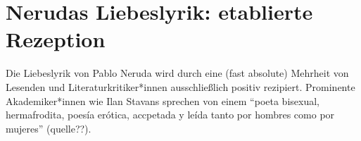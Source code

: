 \section{Nerudas Liebeslyrik: etablierte Rezeption}

Die Liebeslyrik von Pablo Neruda wird durch eine (fast absolute) Mehrheit von Lesenden und Literaturkritiker*innen ausschließlich positiv rezipiert.
Prominente Akademiker*innen wie Ilan Stavans sprechen von einem ``poeta bisexual, hermafrodita, poesía erótica, accpetada y leída tanto por hombres como por mujeres'' (quelle??).

\begin{comment}
Stavans zitieren und polemisch einsteigen: "poeta bisexual, hermafrodita, poesía erótica, accpetada y leída tanto por hombres como por mujeres"
hat er das im Seminar bei uns gesagt?
http://america.aljazeera.com/articles/2014/6/20/the-unknown-neruda.html
"Likewise, the inspiration of some of the “Twenty Love Poems and a Song of Despair” (1924), including poems XV (“Me gustas cuando callas porque estás como ausente”) and XX (“Puedo escribir los versos más tristes esta noche”), seem — there is no better way to put it! — eternal."
Kann man machen
etablierte Rezepzionsperspektive
ist weit nicht der Einzige

Belén Lagos schreibt dem weiblichen Teil Macht zu und dem Mann eine Position von “cierta sutil
impotencia“. Der Mann wird laut ihr zu “una figura frágil, anorante, acosada por la presencia infinita
de la mujer“, sobald dieser mit der idealisierten Frau seiner Träume konfrontiert wird.
\end{comment}
